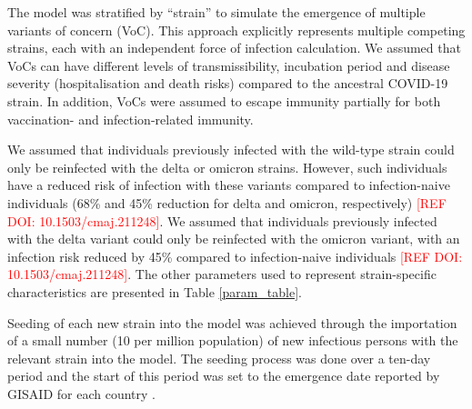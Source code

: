 
The model was stratified by ``strain'' to simulate the emergence of multiple variants of concern (VoC).
This approach explicitly represents multiple competing strains, each with an independent force of infection calculation.
We assumed that VoCs can have different levels of transmissibility, incubation period and disease severity 
(hospitalisation and death risks) compared to the ancestral COVID-19 strain. In addition, VoCs were assumed to escape 
immunity partially for both vaccination- and infection-related immunity. 

We assumed that individuals previously infected with the wild-type strain could only be reinfected with the delta or 
omicron strains. However, such individuals have a reduced risk of infection with these variants compared to 
infection-naive individuals (68\% and 45\% reduction for delta and omicron, respectively) \textcolor{red}{[REF DOI: 10.1503/cmaj.211248]}.
We assumed that individuals previously infected with the delta variant could only be reinfected with the omicron variant, 
with an infection risk reduced by 45\% compared to infection-naive individuals \textcolor{red}{[REF DOI: 10.1503/cmaj.211248]}. 
The other parameters used to represent strain-specific characteristics are presented in Table \ref{param_table}.

Seeding of each new strain into the model was achieved through the importation of a small number (10 per million population) of new infectious persons with the relevant strain into the model.
The seeding process was done over a ten-day period and the start of this period was set to the emergence date reported by GISAID for each country \cite{gisaid2023}.
